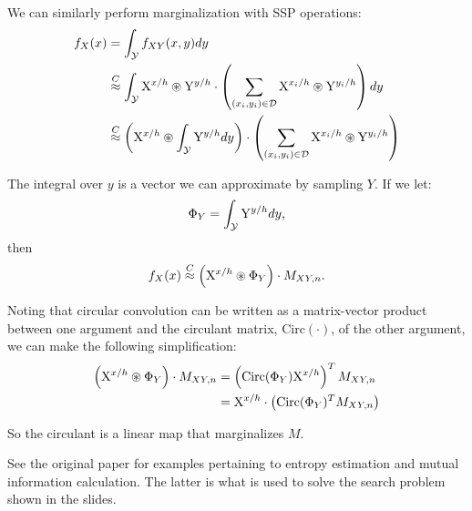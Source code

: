 \documentclass[10pt,letterpaper,oneside]{article}
\newcommand{\bind}{\circledast}
\newcommand{\analog}{\overset{C}{\approx}}
\newcommand{\domain}[1]{\mathcal{#1}}
\newcommand{\ssp}[1]{\mathrm{\uppercase{#1}}^{\lowercase{#1}/h}}
\newcommand{\sspi}[2]{\mathrm{\uppercase{#1}}^{\lowercase{#1}_{#2}/h}}
\begin{document}
We can similarly perform marginalization with SSP operations:
\begin{align}
  f_{X}(x) &= \int_{\domain{Y}}f_{XY}(x,y)dy \\
  &\analog \int_{\domain{Y}}\ssp{X}\bind\ssp{Y} \cdot \left(\sum_{(x_{i},y_{i}) \in \mathcal{D}}\sspi{X}{i}\bind\sspi{Y}{i}\right)dy \\
  &\analog \left(\ssp{X}\bind\int_{\domain{Y}}\ssp{Y}dy\right) \cdot \left(\sum_{(x_{i},y_{i}) \in \mathcal{D}}\sspi{X}{i}\bind\sspi{Y}{i}\right)
\end{align}

The integral over $y$ is a vector we can approximate by sampling $Y$. If we let:
\begin{align}
  \Phi_{Y} = \int_{\domain{Y}}\ssp{Y}dy\text{,}
\end{align}
then
\begin{align}
  f_{X}(x) \analog \left(\ssp{X}\bind\Phi_{Y}\right) \cdot M_{XY,n}.
\end{align}

Noting that circular convolution can be written as a matrix-vector product between one argument and the circulant matrix, $\mathrm{Circ}(\cdot)$, of the other argument, we can make the following simplification:
\begin{align}
  \left(\ssp{X}\bind\Phi_{Y}\right) \cdot M_{XY,n} &= \left(\mathrm{Circ}(\Phi_{Y})\ssp{X}\right)^{T} M_{XY,n}\\
  &= \ssp{X}\cdot\left(\mathrm{Circ}(\Phi_{Y})^{T} M_{XY,n}\right)
\end{align}

So the circulant is a linear map that marginalizes $M$.

See the original paper for examples pertaining to entropy estimation and mutual information calculation.  The latter is what is used to solve the search problem shown in the slides.

\printbibliography
\end{document}
